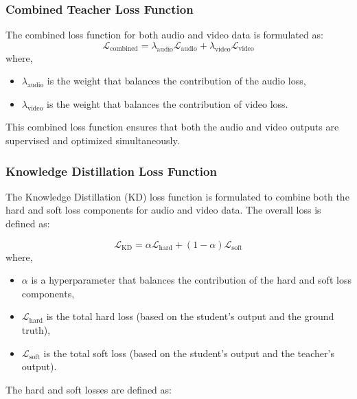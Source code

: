 \documentclass{ioereport}
\begin{document}
        \subsubsection{Combined Teacher Loss Function}
        The combined loss function for both audio and video data is formulated as:
        \begin{equation}
            \mathcal{L}_{\text{combined}} = \lambda_{\text{audio}} \mathcal{L}_{\text{audio}} + \lambda_{\text{video}} \mathcal{L}_{\text{video}}
            \end{equation}
            where,
            \begin{itemize}
                \item \( \lambda_{\text{audio}} \) is the weight that balances the contribution of the audio loss,
                \item \( \lambda_{\text{video}} \) is the weight that balances the contribution of video loss.
            \end{itemize}
    This combined loss function ensures that both the audio and video outputs are supervised and optimized simultaneously.

    \subsubsection{Knowledge Distillation Loss Function}
    The Knowledge Distillation (KD) loss function is formulated to combine both the hard and soft loss components for audio and video data. The overall loss is defined as:

    \begin{equation}
        \mathcal{L}_{\text{KD}} = \alpha \mathcal{L}_{\text{hard}} + (1 - \alpha) \mathcal{L}_{\text{soft}}
    \end{equation}
    where,

    \begin{itemize}
        \item \( \alpha \) is a hyperparameter that balances the contribution of the hard and soft loss components,
        \item \( \mathcal{L}_{\text{hard}} \) is the total hard loss (based on the student's output and the ground truth),
        \item \( \mathcal{L}_{\text{soft}} \) is the total soft loss (based on the student's output and the teacher's output).
    \end{itemize}

    The hard and soft losses are defined as:
\end{document}
